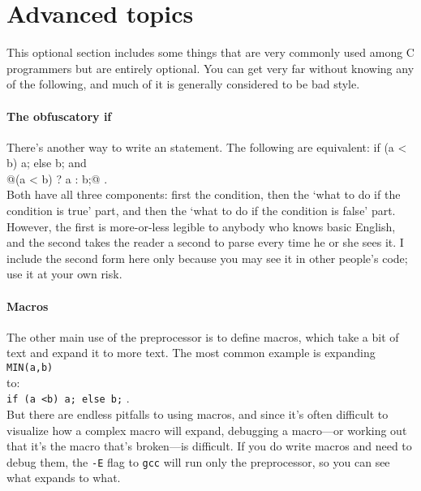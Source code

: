 \documentclass[12pt]{article}
\makeatletter
\def\ind#1{\index{#1}#1}
\def\ttind#1{\index{#1@{\tt #1}}{\tt #1}}
\makeatother
\begin{document}
\section{Advanced topics}
This optional section includes some things that are very commonly used among
C programmers but are entirely optional. You can get very far without
knowing any of the following, and much of it is generally considered to
be bad style.

\paragraph{The obfuscatory if} There's another way to write an \ttind{if} statement. The following are equivalent:
if (a < b)
      a;
else
      b;
and\\ 
@(a < b) ? a : b;@ .\\
Both have all three components: first the condition, then the `what to do if the
condition is true' part, and then the `what to do if the condition is false'
part. However, the first is more-or-less legible to anybody who knows basic English,
and the second takes the reader a second to parse every time he or she
sees it. I include the second form here only because you may see it in
other people's code; use it at your own risk.


\paragraph{Macros} \label{macros} 

The other main use of the preprocessor is to define macros, which take
a bit of text and expand it to more text. The most common example is
expanding\\
{\tt MIN(a,b)}\\
to:\\
{\tt if (a <b) a; else b;} .\\

But there are endless pitfalls to using macros, and since it's often
difficult to visualize how a complex macro will expand, debugging
a macro---or working out that it's the macro that's broken---is
difficult.  If you do write macros and need to debug them, the {\tt -E} flag to {\tt gcc} will run only the \ind{preprocessor}, so you can
see what expands to what.
\end{document}
